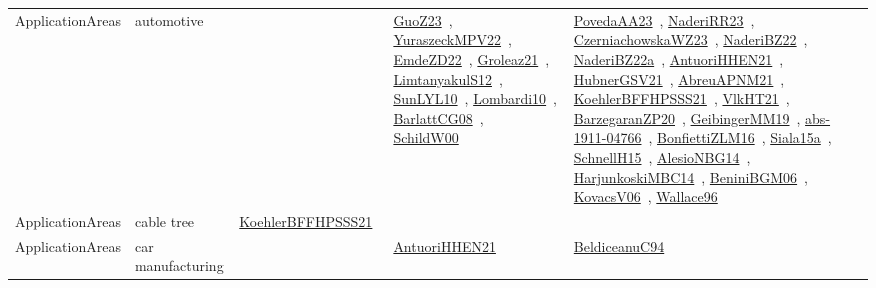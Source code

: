 {\begin{longtable}{lp{3cm}>{\raggedright\arraybackslash}p{6cm}>{\raggedright\arraybackslash}p{6cm}>{\raggedright\arraybackslash}p{8cm}}
ApplicationAreas & automotive &  & \href{works/GuoZ23.pdf}{GuoZ23}~\cite{GuoZ23}, \href{works/YuraszeckMPV22.pdf}{YuraszeckMPV22}~\cite{YuraszeckMPV22}, \href{works/EmdeZD22.pdf}{EmdeZD22}~\cite{EmdeZD22}, \href{works/Groleaz21.pdf}{Groleaz21}~\cite{Groleaz21}, \href{works/LimtanyakulS12.pdf}{LimtanyakulS12}~\cite{LimtanyakulS12}, \href{works/SunLYL10.pdf}{SunLYL10}~\cite{SunLYL10}, \href{works/Lombardi10.pdf}{Lombardi10}~\cite{Lombardi10}, \href{works/BarlattCG08.pdf}{BarlattCG08}~\cite{BarlattCG08}, \href{works/SchildW00.pdf}{SchildW00}~\cite{SchildW00} & \href{works/PovedaAA23.pdf}{PovedaAA23}~\cite{PovedaAA23}, \href{works/NaderiRR23.pdf}{NaderiRR23}~\cite{NaderiRR23}, \href{works/CzerniachowskaWZ23.pdf}{CzerniachowskaWZ23}~\cite{CzerniachowskaWZ23}, \href{works/NaderiBZ22.pdf}{NaderiBZ22}~\cite{NaderiBZ22}, \href{works/NaderiBZ22a.pdf}{NaderiBZ22a}~\cite{NaderiBZ22a}, \href{works/AntuoriHHEN21.pdf}{AntuoriHHEN21}~\cite{AntuoriHHEN21}, \href{works/HubnerGSV21.pdf}{HubnerGSV21}~\cite{HubnerGSV21}, \href{works/AbreuAPNM21.pdf}{AbreuAPNM21}~\cite{AbreuAPNM21}, \href{works/KoehlerBFFHPSSS21.pdf}{KoehlerBFFHPSSS21}~\cite{KoehlerBFFHPSSS21}, \href{works/VlkHT21.pdf}{VlkHT21}~\cite{VlkHT21}, \href{works/BarzegaranZP20.pdf}{BarzegaranZP20}~\cite{BarzegaranZP20}, \href{works/GeibingerMM19.pdf}{GeibingerMM19}~\cite{GeibingerMM19}, \href{works/abs-1911-04766.pdf}{abs-1911-04766}~\cite{abs-1911-04766}, \href{works/BonfiettiZLM16.pdf}{BonfiettiZLM16}~\cite{BonfiettiZLM16}, \href{works/Siala15a.pdf}{Siala15a}~\cite{Siala15a}, \href{works/SchnellH15.pdf}{SchnellH15}~\cite{SchnellH15}, \href{works/AlesioNBG14.pdf}{AlesioNBG14}~\cite{AlesioNBG14}, \href{works/HarjunkoskiMBC14.pdf}{HarjunkoskiMBC14}~\cite{HarjunkoskiMBC14}, \href{works/BeniniBGM06.pdf}{BeniniBGM06}~\cite{BeniniBGM06}, \href{works/KovacsV06.pdf}{KovacsV06}~\cite{KovacsV06}, \href{works/Wallace96.pdf}{Wallace96}~\cite{Wallace96}\\
ApplicationAreas & cable tree & \href{works/KoehlerBFFHPSSS21.pdf}{KoehlerBFFHPSSS21}~\cite{KoehlerBFFHPSSS21} &  & \\
ApplicationAreas & car manufacturing &  & \href{works/AntuoriHHEN21.pdf}{AntuoriHHEN21}~\cite{AntuoriHHEN21} & \href{works/BeldiceanuC94.pdf}{BeldiceanuC94}~\cite{BeldiceanuC94}\\

\end{longtable}}
